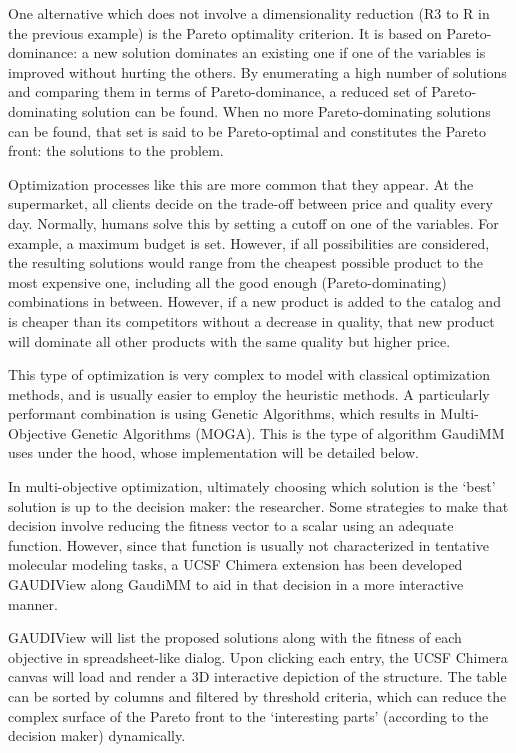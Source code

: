 One alternative which does not involve a dimensionality reduction (R3 to R in the previous example) is the Pareto optimality criterion. It is based on Pareto-dominance: a new solution dominates an existing one if one of the variables is improved without hurting the others. By enumerating a high number of solutions and comparing them in terms of Pareto-dominance, a reduced set of Pareto-dominating solution can be found. When no more Pareto-dominating solutions can be found, that set is said to be Pareto-optimal and constitutes the Pareto front: the solutions to the problem.

Optimization processes like this are more common that they appear. At the supermarket, all clients decide on the trade-off between price and quality every day. Normally, humans solve this by setting a cutoff on one of the variables. For example, a maximum budget is set. However, if all possibilities are considered, the resulting solutions would range from the cheapest possible product to the most expensive one, including all the good enough (Pareto-dominating) combinations in between. However, if a new product is added to the catalog and is cheaper than its competitors without a decrease in quality, that new product will dominate all other products with the same quality but higher price.

This type of optimization is very complex to model with classical optimization methods, and is usually easier to employ the heuristic methods. A particularly performant combination is using Genetic Algorithms, which results in Multi-Objective Genetic Algorithms (MOGA). This is the type of algorithm GaudiMM uses under the hood, whose implementation will be detailed below.



In multi-objective optimization, ultimately choosing which solution is the ‘best’ solution is up to the decision maker: the researcher. Some strategies to make that decision involve reducing the fitness vector to a scalar using an adequate function. However, since that function is usually not characterized in tentative molecular modeling tasks, a UCSF Chimera extension has been developed GAUDIView along GaudiMM to aid in that decision in a more interactive manner.

GAUDIView will list the proposed solutions along with the fitness of each objective in spreadsheet-like dialog. Upon clicking each entry, the UCSF Chimera canvas will load and render a 3D interactive depiction of the structure. The table can be sorted by columns and filtered by threshold criteria, which can reduce the complex surface of the Pareto front to the ‘interesting parts’ (according to the decision maker) dynamically.


